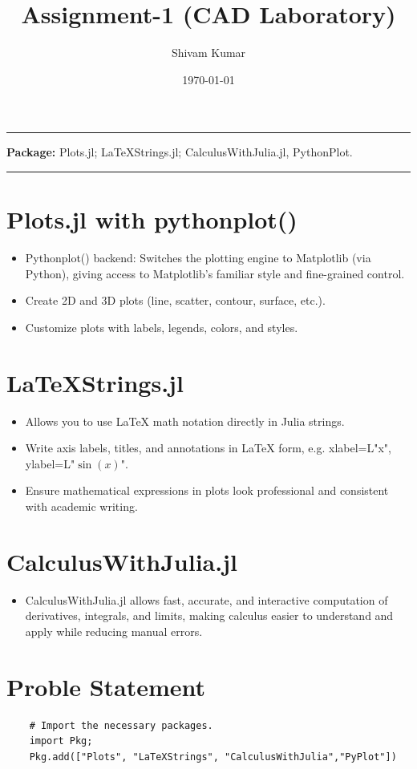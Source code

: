 \documentclass{homework}
\author{Shivam Kumar}
\date{\today}
\title{Assignment-1 (CAD Laboratory)}
\begin{document}
 \maketitle

\rule{\linewidth}{0.4pt} 
    \textbf{Package:} Plots.jl; LaTeXStrings.jl; CalculusWithJulia.jl, PythonPlot. \\
\rule{\linewidth}{0.4pt}  %

\section{Plots.jl with pythonplot()}
\begin{itemize}
    \item Pythonplot() backend: Switches the plotting engine to Matplotlib (via Python), giving access to Matplotlib’s familiar style and fine-grained control.
    \item Create 2D and 3D plots (line, scatter, contour, surface, etc.).
    \item Customize plots with labels, legends, colors, and styles.
\end{itemize}

\section{LaTeXStrings.jl}
\begin{itemize}
    \item Allows you to use LaTeX math notation directly in Julia strings.
    \item Write axis labels, titles, and annotations in LaTeX form, e.g. xlabel=L"x", ylabel=L"\(\sin(x)\)".
    \item Ensure mathematical expressions in plots look professional and consistent with academic writing.
\end{itemize}

\section{CalculusWithJulia.jl}
\begin{itemize}
    \item CalculusWithJulia.jl allows fast, accurate, and interactive computation of derivatives, integrals, and limits, making calculus easier to understand and apply while reducing manual errors.
\end{itemize}

\section{Proble Statement}
\begin{verbatim}
    # Import the necessary packages.
    import Pkg;
    Pkg.add(["Plots", "LaTeXStrings", "CalculusWithJulia","PyPlot"])
\end{verbatim}
\end{document}
